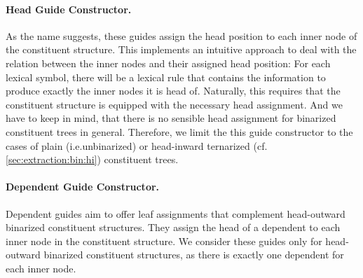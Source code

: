 \documentclass[../../document.tex]{subfiles}
\begin{document}
    \paragraph{Head Guide Constructor.}
    As the name suggests, these guides assign the head position to each inner node of the constituent structure.
    This implements an intuitive approach to deal with the relation between the inner nodes and their assigned head position: For each lexical symbol, there will be a lexical rule that contains the information to produce exactly the inner nodes it is head of.
    Naturally, this requires that the constituent structure is equipped with the necessary head assignment.
    And we have to keep in mind, that there is no sensible head assignment for binarized constituent trees in general.
    Therefore, we limit the this guide constructor to the cases of plain (i.e.\@ unbinarized) or head-inward ternarized (cf.\@ \cref{sec:extraction:bin:hi}) constituent trees.

    \paragraph{Dependent Guide Constructor.}
    Dependent guides aim to offer leaf assignments that complement head-outward binarized constituent structures.
    They assign the head of a dependent to each inner node in the constituent structure.
    We consider these guides only for head-outward binarized constituent structures, as there is exactly one dependent for each inner node.
\end{document}
